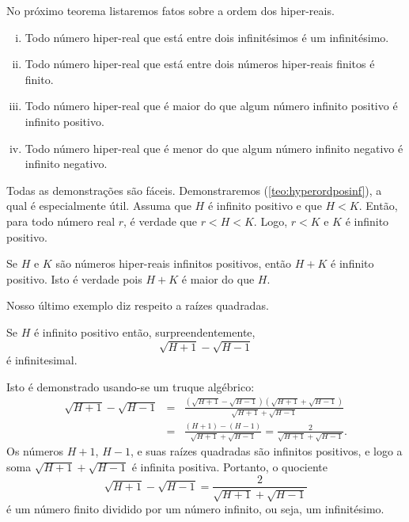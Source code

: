 No próximo teorema listaremos fatos sobre a ordem dos hiper-reais.

\begin{theorem}
\par\noindent
\begin{enumerate}[(i)]
\item Todo número hiper-real que está entre dois infinitésimos é um
      infinitésimo.
\item Todo número hiper-real que está entre dois números hiper-reais
      finitos é finito.
\item Todo número hiper-real que é maior do que algum número infinito
      positivo é infinito positivo.\label{teo:hyperordposinf}
\item Todo número hiper-real que é menor do que algum número infinito
      negativo é infinito negativo.
\end{enumerate}
\end{theorem}

Todas as demonstrações são fáceis. Demonstraremos (\ref{teo:hyperordposinf}),
a qual é especialmente útil. Assuma que $H$ é infinito positivo e que $H < K$.
Então, para todo número real $r$, é verdade que $r < H < K$. Logo,
$r < K$ e $K$ é infinito positivo.

\begin{example}
Se $H$ e $K$ são números hiper-reais infinitos positivos, então $H+K$
é infinito positivo. Isto é verdade pois $H+K$ é maior do que $H$.
\end{example}

Nosso último exemplo diz respeito a raízes quadradas.

\begin{example}
Se $H$ é infinito positivo então, surpreendentemente,
$$
  \sqrt{H + 1} - \sqrt{H - 1}
$$
é infinitesimal.

Isto é demonstrado usando-se um truque algébrico:
\begin{eqnarray*}
  \sqrt{H + 1} - \sqrt{H - 1} & = &
    \frac{(\sqrt{H + 1} - \sqrt{H - 1})(\sqrt{H + 1} + \sqrt{H - 1})}%
         {\sqrt{H + 1} + \sqrt{H - 1}} \\
  & = &
    \frac{(H + 1) - (H - 1)}{\sqrt{H + 1} + \sqrt{H - 1}} =
      \frac{2}{\sqrt{H + 1} + \sqrt{H - 1}}.
\end{eqnarray*}
Os números $H+1$, $H-1$, e suas raízes quadradas são infinitos positivos, e
logo a soma $\sqrt{H + 1} + \sqrt{H - 1}$ é infinita positiva. Portanto, o
quociente
$$
  \sqrt{H + 1} - \sqrt{H - 1} = \frac{2}{\sqrt{H + 1} + \sqrt{H - 1}}
$$
é um número finito dividido por um número infinito, ou seja, um infinitésimo.
\end{example}

